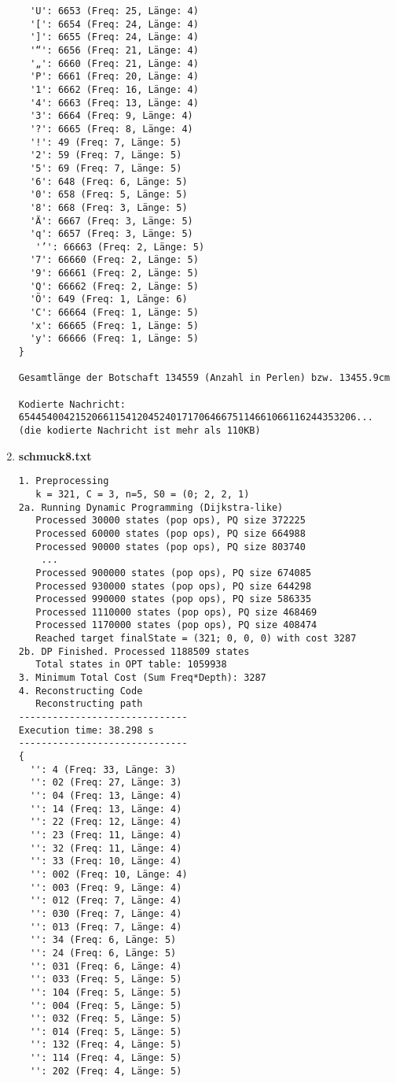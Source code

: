 \documentclass[a4paper,10pt,ngerman]{scrartcl}
\begin{document}
\begin{enumerate}
\begin{verbatim}
  'U': 6653 (Freq: 25, Länge: 4)
  '[': 6654 (Freq: 24, Länge: 4)
  ']': 6655 (Freq: 24, Länge: 4)
  '“': 6656 (Freq: 21, Länge: 4)
  '„': 6660 (Freq: 21, Länge: 4)
  'P': 6661 (Freq: 20, Länge: 4)
  '1': 6662 (Freq: 16, Länge: 4)
  '4': 6663 (Freq: 13, Länge: 4)
  '3': 6664 (Freq: 9, Länge: 4)
  '?': 6665 (Freq: 8, Länge: 4)
  '!': 49 (Freq: 7, Länge: 5)
  '2': 59 (Freq: 7, Länge: 5)
  '5': 69 (Freq: 7, Länge: 5)
  '6': 648 (Freq: 6, Länge: 5)
  '0': 658 (Freq: 5, Länge: 5)
  '8': 668 (Freq: 3, Länge: 5)
  'Ä': 6667 (Freq: 3, Länge: 5)
  'q': 6657 (Freq: 3, Länge: 5)
   '’': 66663 (Freq: 2, Länge: 5)
  '7': 66660 (Freq: 2, Länge: 5)
  '9': 66661 (Freq: 2, Länge: 5)
  'Q': 66662 (Freq: 2, Länge: 5)
  'Ö': 649 (Freq: 1, Länge: 6)
  'C': 66664 (Freq: 1, Länge: 5)
  'x': 66665 (Freq: 1, Länge: 5)
  'y': 66666 (Freq: 1, Länge: 5)
}

Gesamtlänge der Botschaft 134559 (Anzahl in Perlen) bzw. 13455.9cm

Kodierte Nachricht: 654454004215206611541204524017170646675114661066116244353206... (die kodierte Nachricht ist mehr als 110KB)
\end{verbatim}

\item \textbf{schmuck8.txt}
\begin{verbatim}
1. Preprocessing
   k = 321, C = 3, n=5, S0 = (0; 2, 2, 1)
2a. Running Dynamic Programming (Dijkstra-like)
   Processed 30000 states (pop ops), PQ size 372225
   Processed 60000 states (pop ops), PQ size 664988
   Processed 90000 states (pop ops), PQ size 803740
    ... 
   Processed 900000 states (pop ops), PQ size 674085
   Processed 930000 states (pop ops), PQ size 644298
   Processed 990000 states (pop ops), PQ size 586335
   Processed 1110000 states (pop ops), PQ size 468469
   Processed 1170000 states (pop ops), PQ size 408474
   Reached target finalState = (321; 0, 0, 0) with cost 3287
2b. DP Finished. Processed 1188509 states
   Total states in OPT table: 1059938
3. Minimum Total Cost (Sum Freq*Depth): 3287
4. Reconstructing Code
   Reconstructing path
------------------------------
Execution time: 38.298 s
------------------------------
{
  '': 4 (Freq: 33, Länge: 3)
  '': 02 (Freq: 27, Länge: 3)
  '': 04 (Freq: 13, Länge: 4)
  '': 14 (Freq: 13, Länge: 4)
  '': 22 (Freq: 12, Länge: 4)
  '': 23 (Freq: 11, Länge: 4)
  '': 32 (Freq: 11, Länge: 4)
  '': 33 (Freq: 10, Länge: 4)
  '': 002 (Freq: 10, Länge: 4)
  '': 003 (Freq: 9, Länge: 4)
  '': 012 (Freq: 7, Länge: 4)
  '': 030 (Freq: 7, Länge: 4)
  '': 013 (Freq: 7, Länge: 4)
  '': 34 (Freq: 6, Länge: 5)
  '': 24 (Freq: 6, Länge: 5)
  '': 031 (Freq: 6, Länge: 4)
  '': 033 (Freq: 5, Länge: 5)
  '': 104 (Freq: 5, Länge: 5)
  '': 004 (Freq: 5, Länge: 5)
  '': 032 (Freq: 5, Länge: 5)
  '': 014 (Freq: 5, Länge: 5)
  '': 132 (Freq: 4, Länge: 5)
  '': 114 (Freq: 4, Länge: 5)
  '': 202 (Freq: 4, Länge: 5)


\end{verbatim}
\end{enumerate}
\end{document}
